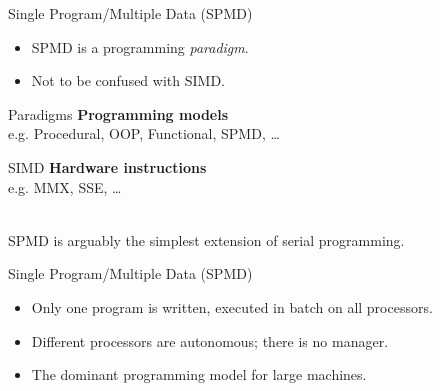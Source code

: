 \begin{frame}
  \begin{block}{Single Program/Multiple Data (SPMD)}\pause
    \begin{itemize}
      \item SPMD is a programming \emph{paradigm}.
      \item Not to be confused with SIMD.
	\end{itemize}\centering
	\begin{minipage}{.45\textwidth}
	\begin{block}{Paradigms}
	  \textbf{Programming models}\\
	  e.g. Procedural, OOP, Functional, SPMD, \dots
	\end{block}
	\end{minipage}
	\hspace{.2cm}
	\begin{minipage}{.45\textwidth}
	\begin{block}{SIMD}
	  \textbf{Hardware instructions}\\
	  e.g. MMX, SSE, \dots
	\end{block}
	\end{minipage}
     \\[.4cm]
     SPMD is arguably the simplest extension of serial programming.
  \end{block}
\end{frame}


\begin{frame}
  \begin{block}{Single Program/Multiple Data (SPMD)}\pause
    \begin{itemize}
      \item Only one program is written, executed in batch on all processors.
      \item Different processors are autonomous; there is no manager.
      \item The dominant programming model for large machines.
    \end{itemize}
  \end{block}
\end{frame}
